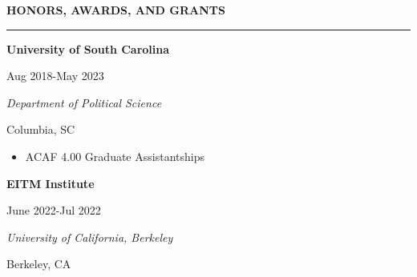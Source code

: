 \documentclass[
  16,
]{article}
\providecommand{\tightlist}{%
  \setlength{\itemsep}{0pt}\setlength{\parskip}{0pt}}\usepackage{longtable,booktabs,array}
\begin{document}
\vspace{7pt}

\begin{large}{\bf HONORS, AWARDS, AND GRANTS}
  \vspace{3pt}
  \hrule
  \begin{multicols}{2}
    \begin{flushleft}{\bf University of South Carolina}\end{flushleft}
    \begin{flushright}Aug 2018-May 2023\end{flushright}
  \end{multicols}
  \vspace{-0.17cm}
  \begin{multicols}{2}
    \begin{flushleft}\textit{Department of Political Science}\end
    {flushleft}\begin{flushright}Columbia, SC\end
    {flushright}
  \end{multicols}
\end{large}
\vspace{-0.16cm}

\begin{itemize}
\tightlist
\item
  ACAF 4.00 Graduate Assistantships
\end{itemize}

\vspace{7pt}

\begin{large}
  \begin{multicols}{2}
    \begin{flushleft}{\bf EITM Institute}\end{flushleft}
    \begin{flushright}June 2022-Jul 2022\end{flushright}
  \end{multicols}
  \vspace{-0.17cm}
  \begin{multicols}{2}
    \begin{flushleft}\textit{University of California, Berkeley}\end
    {flushleft}\begin{flushright}Berkeley, CA\end
    {flushright}
  \end{multicols}
\end{large}
\vspace{-0.16cm}
\end{document}
